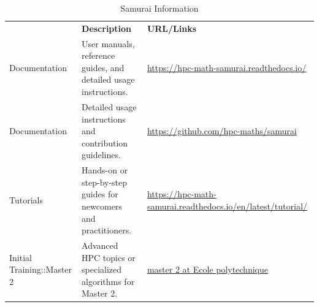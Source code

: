 \begin{table}[H]
{{%
    {
    \setlength{\parindent}{0pt}
    \def\arraystretch{1.25}
    {\fontsize{9}{11}\selectfont
    \begin{tabular}{!{\color{numpexgray}\vrule}p{0.20\textwidth}
                    !{\color{numpexgray}\vrule}p{0.40\textwidth}
                    !{\color{numpexgray}\vrule}p{0.35\textwidth}
                    !{\color{numpexgray}\vrule}}
         & {\rule{0pt}{2.5ex}\color{white}\bf Description}
         & {\rule{0pt}{2.5ex}\color{white}\bf URL/Links} \\
Documentation & User manuals, reference guides, and detailed usage instructions. & \href{https://hpc-math-samurai.readthedocs.io/}{https://hpc-math-samurai.readthedocs.io/} \\
Documentation & Detailed usage instructions and contribution guidelines. & \href{https://github.com/hpc-maths/samurai}{https://github.com/hpc-maths/samurai} \\
Tutorials & Hands-on or step-by-step guides for newcomers and practitioners. & \href{https://hpc-math-samurai.readthedocs.io/en/latest/tutorial/index.html}{https://hpc-math-samurai.readthedocs.io/en/latest/tutorial/} \\
Initial Training::Master 2 & Advanced HPC topics or specialized algorithms for Master 2. & \href{https://cours_ams_x02.gitlab.labos.polytechnique.fr/jb_2024_2025}{master 2 at Ecole polytechnique} \\
\bottomrule
    \end{tabular}
    }}

    }}
    \caption{Samurai Information}
\end{table}


